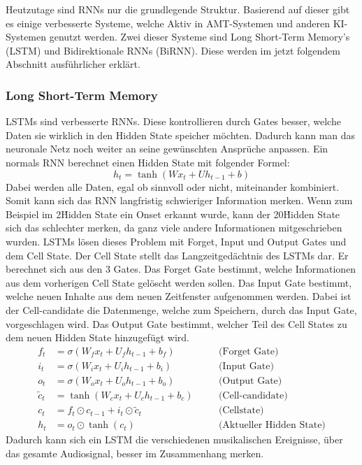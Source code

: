 Heutzutage sind RNNs nur die grundlegende Struktur.
Basierend auf dieser gibt es einige verbesserte Systeme,
welche Aktiv in AMT-Systemen und anderen KI-Systemen genutzt werden.
Zwei dieser Systeme sind Long Short-Term Memory's (LSTM) und Bidirektionale RNNs (BiRNN).
Diese werden im jetzt folgendem Abschnitt ausführlicher erklärt.

\subsubsection{Long Short-Term Memory}
LSTMs sind verbesserte RNNs.
Diese kontrollieren durch Gates besser, welche Daten sie wirklich in den Hidden State speicher möchten.
Dadurch kann man das neuronale Netz noch weiter an seine gewünschten Ansprüche anpassen.
Ein normals RNN berechnet einen Hidden State mit folgender Formel:
\begin{equation*}
h_t = \tanh(W x_t + U h_{t-1} + b)
\end{equation*}
Dabei werden alle Daten, egal ob sinnvoll oder nicht, miteinander kombiniert.
Somit kann sich das RNN langfristig schwieriger Information merken.
Wenn zum Beispiel im 2\. Hidden State ein Onset erkannt wurde, kann der 20\. Hidden State
sich das schlechter merken, da ganz viele andere Informationen mitgeschrieben wurden.
LSTMs lösen dieses Problem mit Forget, Input und Output Gates und dem Cell State.
Der Cell State stellt das Langzeitgedächtnis des LSTMs dar.
Er berechnet sich aus den 3 Gates.
Das Forget Gate bestimmt, welche Informationen aus dem vorherigen Cell State gelöscht werden sollen.
Das Input Gate bestimmt, welche neuen Inhalte aus dem neuen Zeitfenster aufgenommen werden.
Dabei ist der Cell-candidate die Datenmenge, welche zum Speichern, durch das Input Gate, vorgeschlagen wird.
Das Output Gate bestimmt, welcher Teil des Cell States zu dem neuen Hidden State hinzugefügt wird.
\begin{align*}
f_t &= \sigma(W_f x_t + U_f h_{t-1} + b_f) \quad &&\text{(Forget Gate)} \\
i_t &= \sigma(W_i x_t + U_i h_{t-1} + b_i) \quad &&\text{(Input Gate)} \\
o_t &= \sigma(W_o x_t + U_o h_{t-1} + b_o) \quad &&\text{(Output Gate)} \\
\tilde{c}_t &= \tanh(W_c x_t + U_c h_{t-1} + b_c) \quad &&\text{(Cell-candidate)} \\
c_t &= f_t \odot c_{t-1} + i_t \odot \tilde{c}_t \quad &&\text{(Cellstate)} \\
h_t &= o_t \odot \tanh(c_t) \quad &&\text{(Aktueller Hidden State)}
\end{align*}
Dadurch kann sich ein LSTM die verschiedenen musikalischen Ereignisse,
über das gesamte Audiosignal, besser im Zusammenhang merken.

